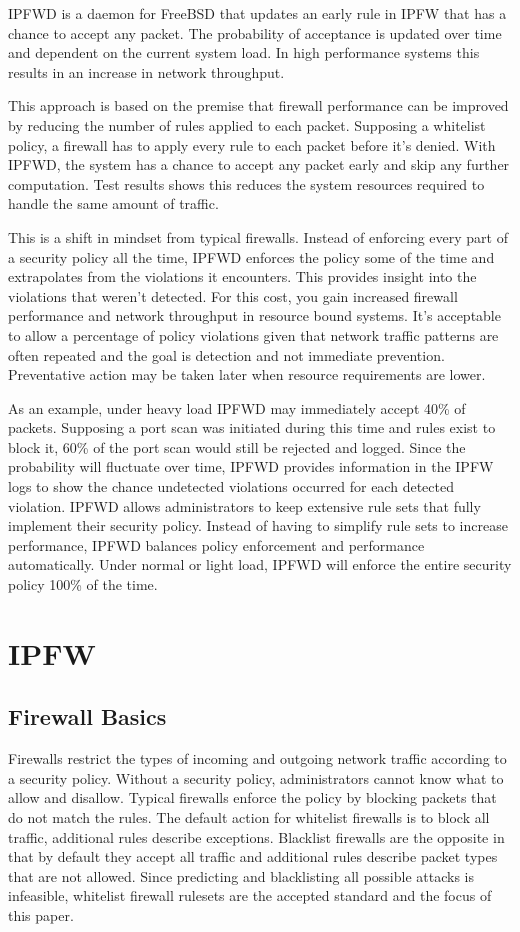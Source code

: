\documentclass[journal]{IEEEtran}
\begin{document}
IPFWD is a daemon for FreeBSD that updates an early rule in IPFW that has a
chance to accept any packet. The probability of acceptance is updated over time
and dependent on the current system load. In high performance systems this results in an increase in network throughput.

This approach is based on the premise that firewall performance can be improved
by reducing the number of rules applied to each packet. Supposing a whitelist
policy, a firewall has to apply every rule to each packet before it's denied.
With IPFWD, the system has a chance to accept any packet early and skip any further
computation. Test results shows this reduces the system resources required to
handle the same amount of traffic.

This is a shift in mindset from typical firewalls. Instead of enforcing every
part of a security policy all the time, IPFWD enforces the policy some of the
time and extrapolates from the violations it encounters. This provides insight
into the violations that weren't detected. For this cost, you gain increased
firewall performance and network throughput in resource bound systems. It's
acceptable to allow a percentage of policy violations given that network
traffic patterns are often repeated and the goal is detection and not immediate
prevention. Preventative action may be taken later when resource requirements
are lower.

As an example, under heavy load IPFWD may immediately accept 40\% of packets.
Supposing a port scan was initiated during this time and rules exist to block
it, 60\% of the port scan would still be rejected and logged. Since the
probability will fluctuate over time, IPFWD provides information in the IPFW
logs to show the chance undetected violations occurred for each detected
violation. IPFWD allows administrators to keep extensive rule sets that fully
implement their security policy. Instead of having to simplify rule sets to
increase performance, IPFWD balances policy enforcement and performance
automatically. Under normal or light load, IPFWD will enforce the entire
security policy 100\% of the time.

\section{IPFW}

\subsection{Firewall Basics}
Firewalls restrict the types of incoming and outgoing network traffic according
to a security policy. Without a security policy, administrators cannot know
what to allow and disallow. Typical firewalls enforce the policy by blocking
packets that do not match the rules. The default action for whitelist firewalls is to
block all traffic, additional rules describe exceptions. Blacklist firewalls
are the opposite in that by default they accept all traffic and additional
rules describe packet types that are not allowed. Since predicting and
blacklisting all possible attacks is infeasible, whitelist firewall rulesets
are the accepted standard and the focus of this paper.
\end{document}
